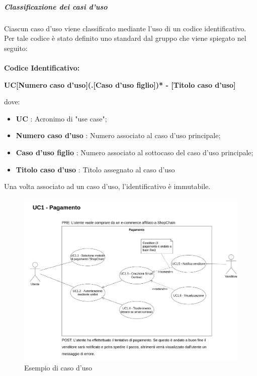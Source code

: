             \subparagraph{Classificazione dei casi d'uso} \label{subparagraph:Classificazione dei casi d'uso}
            Ciascun caso d'uso viene classificato mediante l'uso di un codice identificativo. Per tale codice è stato definito uno standard dal gruppo che viene spiegato nel seguito:\\\\
            \textbf{Codice Identificativo:}\\
            \begin{center}
                \textbf{\Large{UC[Numero caso d’uso](.[Caso d’uso figlio])* - [Titolo caso d’uso]}}
            \end{center}
            dove:
            \begin{itemize}[label={}]
                \item \textbf{UC} : Acronimo di "use case";
                \item \textbf{Numero caso d'uso} : Numero associato al caso d'uso principale;
                \item \textbf{Caso d'uso figlio} : Numero associato al sottocaso del caso d'uso principale;
                \item \textbf{Titolo caso d'uso} : Titolo assegnato al caso d'uso
            \end{itemize}

            Una volta associato ad un caso d'uso, l'identificativo è immutabile.
            \begin{figure}[H]
                \centering
                \includegraphics[scale=0.3]{../template/images/useCases/useCase.png}
                \caption{Esempio di caso d'uso}
            \end{figure}
            
